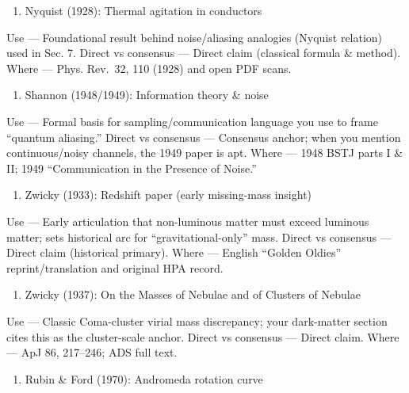 \documentclass[
]{article}
\providecommand{\tightlist}{%
  \setlength{\itemsep}{0pt}\setlength{\parskip}{0pt}}
\begin{document}
\begin{enumerate}
\def\labelenumi{\arabic{enumi})}
\setcounter{enumi}{2}
\tightlist
\item
  Nyquist (1928): Thermal agitation in conductors
\end{enumerate}

Use --- Foundational result behind noise/aliasing analogies (Nyquist
relation) used in Sec. 7. Direct vs consensus --- Direct claim
(classical formula \& method). Where --- Phys. Rev.~32, 110 (1928) and
open PDF scans.

\begin{enumerate}
\def\labelenumi{\arabic{enumi})}
\setcounter{enumi}{3}
\tightlist
\item
  Shannon (1948/1949): Information theory \& noise
\end{enumerate}

Use --- Formal basis for sampling/communication language you use to
frame ``quantum aliasing.'' Direct vs consensus --- Consensus anchor;
when you mention continuous/noisy channels, the 1949 paper is apt. Where
--- 1948 BSTJ parts I \& II; 1949 ``Communication in the Presence of
Noise.''

\begin{enumerate}
\def\labelenumi{\arabic{enumi})}
\setcounter{enumi}{4}
\tightlist
\item
  Zwicky (1933): Redshift paper (early missing-mass insight)
\end{enumerate}

Use --- Early articulation that non-luminous matter must exceed luminous
matter; sets historical arc for ``gravitational-only'' mass. Direct vs
consensus --- Direct claim (historical primary). Where --- English
``Golden Oldies'' reprint/translation and original HPA record.

\begin{enumerate}
\def\labelenumi{\arabic{enumi})}
\setcounter{enumi}{5}
\tightlist
\item
  Zwicky (1937): On the Masses of Nebulae and of Clusters of Nebulae
\end{enumerate}

Use --- Classic Coma-cluster virial mass discrepancy; your dark-matter
section cites this as the cluster-scale anchor. Direct vs consensus ---
Direct claim. Where --- ApJ 86, 217--246; ADS full text.

\begin{enumerate}
\def\labelenumi{\arabic{enumi})}
\setcounter{enumi}{6}
\tightlist
\item
  Rubin \& Ford (1970): Andromeda rotation curve
\end{enumerate}
\end{document}
